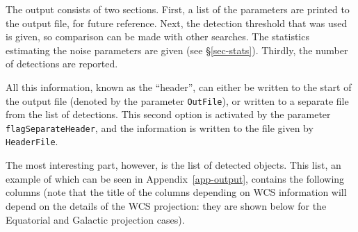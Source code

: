 The output consists of two sections. First, a list of the parameters
are printed to the output file, for future reference. Next, the
detection threshold that was used is given, so comparison can be made
with other searches. The statistics estimating the noise parameters
are given (see \S\ref{sec-stats}). Thirdly, the number of detections
are reported.

All this information, known as the ``header'', can either be written
to the start of the output file (denoted by the parameter
\texttt{OutFile}), or written to a separate file from the list of
detections. This second option is activated by the parameter
\texttt{flagSeparateHeader}, and the information is written to the
file given by \texttt{HeaderFile}.

The most interesting part, however, is the list of detected
objects. This list, an example of which can be seen in
Appendix~\ref{app-output}, contains the following columns (note that
the title of the columns depending on WCS information will depend on
the details of the WCS projection: they are shown below for the
Equatorial and Galactic projection cases).


